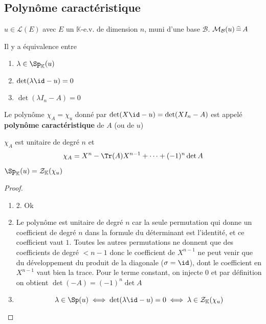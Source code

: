 \subsection{Polynôme caractéristique}


\begin{thmdef}
    \Hyp $u\in\mathcal L(E)$ avec $E$ un $\mathbb K$-e.v. de dimension $n$, muni d'une base $\mathcal B$. $\mathcal M_{\mathcal B}(u)\,\widehat=\, A$
    \begin{concenum}
        \item Il y a équivalence entre \begin{enumerate}
            \item $\lambda\in\Sp_{\mathbb K}(u)$
            \item $\det(\lambda\id-u)=0$
            \item $\det(\lambda I_n-A)=0$
        \end{enumerate}
        \item Le polynôme $\chi_A=\chi_u$ donné par $\det(X\id -u)=\det(X I_n-A)$ est appelé \textbf{polynôme caractéristique} de $A$ (ou de $u$)
        \item $\chi_A$ est unitaire de degré $n$ et \[
                \chi_A=X^n-\Tr (A) X^{n-1}+\cdots +(-1)^n\det A
            \]
        \item  $\Sp_{\mathbb K}(u)=\mathcal Z_{\mathbb K}(\chi_u)$
    \end{concenum}
\end{thmdef}

\begin{proof}
    \begin{enumerate}
        \item 2. Ok
        \setcounter{enumi}{2}
    \item Le polynôme est unitaire de degré $n$ car la seule permutation qui donne un coefficient de degré $n$ dans la formule du déterminant est l'identité, et ce coefficient vaut $1$. Toutes les autres permutations ne donnent que des coefficients de degré $<n-1$ donc le coefficient de $X^{n-1}$ ne peut venir que du développement du produit de la diagonale ($\sigma=\id$), dont le coefficient en $X^{n-1}$ vaut bien la trace. Pour le terme constant, on injecte $0$ et par définition on obtient $\det(-A)=(-1)^n\det A$
    \item \[
            \lambda\in\Sp(u)\iff \det(\lambda \id -u)=0\iff \lambda\in\mathcal Z_{\mathbb K}(\chi_u)
        \]
    \end{enumerate}
\end{proof}

